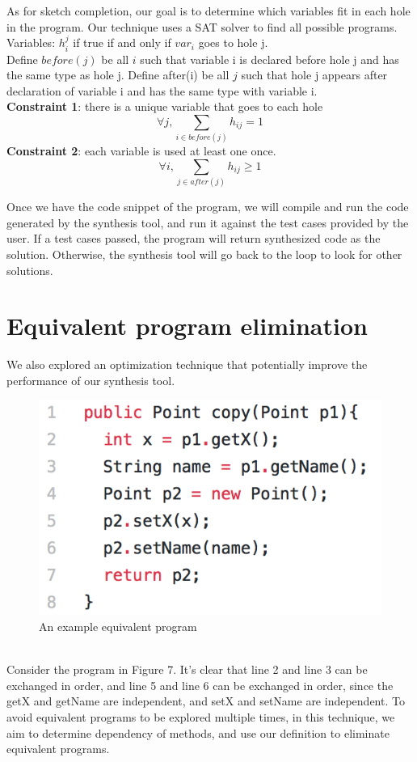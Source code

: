 \documentclass[twocolumn]{article}
\begin{document}
As for sketch completion, our goal is to determine which variables fit in each hole in the program. Our technique uses a SAT solver to find all possible programs.\\
Variables: $h_{i}^j$ if true if and only if $var_i$ goes to hole j.\\
Define $before(j)$ be all $i$ such that variable i is declared before hole j and has the same type as hole j. Define after(i) be all $j$ such that hole j appears after declaration of variable i and has the same type with variable i.\\

\textbf{Constraint 1}: there is a unique variable that goes to each hole
$$\forall j, \sum_{i \in before(j)}h_{ij} = 1$$
\textbf{Constraint 2}: each variable is used at least one once.
$$\forall i, \sum_{j \in after(j)}h_{ij} \geqslant 1$$

Once we have the code snippet of the program, we will compile and run the code generated by the synthesis tool, and run it against the test cases provided by the user. If a test cases passed, the program will return synthesized code as the solution. Otherwise, the synthesis tool will go back to the loop to look for other solutions.\\


\section{Equivalent program elimination}
We also explored an optimization technique that potentially improve the performance of our synthesis tool.
\begin{figure}[H]
\centering
\includegraphics[scale = 0.7]{equiveg.png}
\caption{An example equivalent program}

\end{figure}\\
Consider the program in Figure 7. It's clear that line 2 and line 3 can be exchanged in order, and line 5 and line 6 can be exchanged in order, since the getX and getName are independent, and setX and setName are independent. To avoid equivalent programs to be explored multiple times, in this technique, we aim to determine dependency of methods, and use our definition to eliminate equivalent programs.\\
\end{document}
